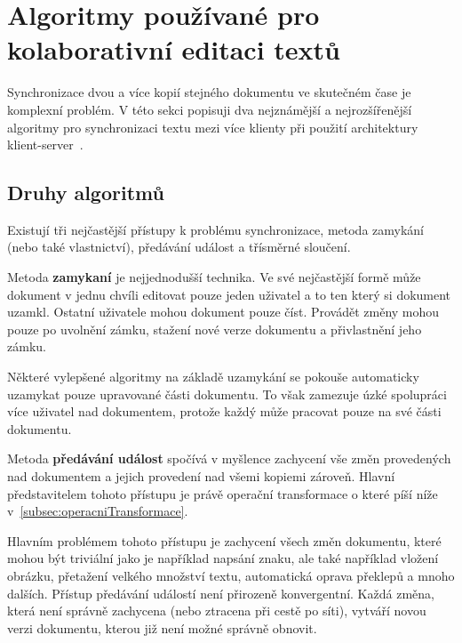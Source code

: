 
\section{Algoritmy používané pro kolaborativní editaci textů}\label{sec:algoritmyProKolaborativníEditaci}

Synchronizace dvou a více kopií stejného dokumentu ve skutečném čase je komplexní problém.
V této sekci popisuji dva nejznámější a nejrozšířenější algoritmy pro synchronizaci textu mezi více klienty při použití architektury klient-server~\cite{algoritmy:first}.

\subsection{Druhy algoritmů}\label{subsec:druhyAlgoritmů}

Existují tři nejčastější přístupy k problému synchronizace, metoda zamykání (nebo také vlastnictví), předávání událost a třísměrné sloučení.

Metoda \textbf{zamykaní} je nejjednodušší technika.
Ve své nejčastější formě může dokument v jednu chvíli editovat pouze jeden uživatel a to ten který si dokument uzamkl.
Ostatní uživatele mohou dokument pouze číst.
Provádět změny mohou pouze po uvolnění zámku, stažení nové verze dokumentu a přivlastnění jeho zámku.

Některé vylepšené algoritmy na základě uzamykání se pokouše automaticky uzamykat pouze upravované části dokumentu.
To však zamezuje úzké spolupráci více uživatel nad dokumentem, protože každý může pracovat pouze na své části dokumentu.

Metoda \textbf{předávání událost} spočívá v myšlence zachycení vše změn provedených nad dokumentem a jejich provedení nad všemi kopiemi zároveň.
Hlavní představitelem tohoto přístupu je právě operační transformace o které píší níže v~\ref{subsec:operacniTransformace}.

Hlavním problémem tohoto přístupu je zachycení všech změn dokumentu, které mohou být triviální jako je například napsání znaku, ale také například vložení obrázku, přetažení velkého množství textu, automatická oprava překlepů a mnoho dalších.
Přístup předávání událostí není přirozeně konvergentní.
Každá změna, která není správně zachycena (nebo ztracena při cestě po síti), vytváří novou verzi dokumentu, kterou již není možné správně obnovit.

